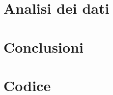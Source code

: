 \documentclass[10pt,a4paper]{article} %
\begin{document}
\clearpage
\section{Analisi dei dati}
	

\section{Conclusioni}
	
	
\section{Codice}
	
	

\end{document}
